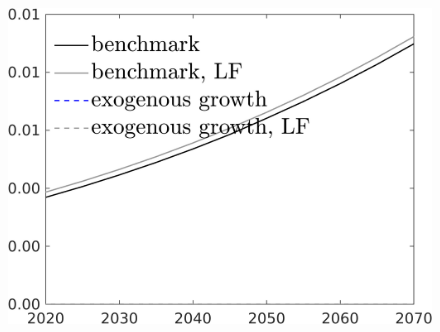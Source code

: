 \begin{figure}[h!!]
\begin{minipage}[]{0.32\textwidth}
 	\end{minipage}
 	\begin{minipage}[]{0.32\textwidth}
 		\includegraphics[width=1\textwidth]{../../codding_model/own_basedOnFried/optimalPol_190722_tidiedUp/figures/all_10Aout22/CountXgrTaulLF_target_wsf_spillover0_sep1_extern0_PV1_etaa0.79_lgd1.png}
 	\end{minipage}
 \end{figure}
 
